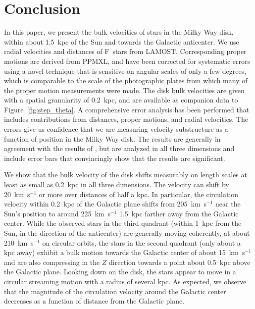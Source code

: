 \documentclass[11pt,preprint]{aastex6}
\begin{document}
\section{Conclusion}

In this paper, we present the bulk velocities of stars in the Milky Way disk, within about 1.5~kpc of the Sun  and towards the Galactic anticenter.  We use radial velocities and distances of F~stars from LAMOST.   Corresponding proper motions are derived from PPMXL, and have been corrected for systematic errors using a novel technique that is sensitive on angular scales of only a few degrees, which is comparable to the scale of the photographic plates from which many of the proper motion measurements were made.  The disk bulk velocities are given with a spatial granularity of 0.2~kpc, and are available as companion data to Figure~\ref{fig:step_theta}.  A comprehensive error analysis has been performed that includes contributions from distances, proper motions, and radial velocities.  The errors give us confidence that we are measuring  velocity substructure as a function of position in the Milky Way disk.  The results are generally in agreement with the results of \citet{Carlin2013}, but are analyzed in all three dimensions and include error bars that convincingly show that the results are significant.

We show that the bulk velocity of the disk shifts measurably on length scales at least as small as 0.2~kpc in all three dimensions.  The velocity can shift by 20~km~s$^{-1}$ or more over distances of half a kpc.  In particular, the circulation velocity within 0.2~kpc of the Galactic plane shifts from 205~km~s$^{-1}$ near the Sun's position to around 225~km~s$^{-1}$ 1.5~kpc farther away from the Galactic center.  While the observed stars in the third quadrant (within 1~kpc from the Sun, in the direction of the anticenter) are generally moving coherently, at about 210~km~s$^{-1}$ on circular orbits, the stars in the second quadrant (only about a kpc away) exhibit a bulk motion towards the Galactic center of about 15~km~s$^{-1}$ and are also compressing in the $Z$ direction towards a point about 0.5~kpc above the Galactic plane.  Looking down on the disk, the stars appear to move in a circular streaming motion with a radius of several kpc.
As expected, we observe that the magnitude of the circulation velocity around the Galactic center decreases as a function of distance from the Galactic plane.
\end{document}
